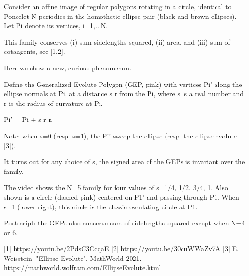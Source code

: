 Consider an affine image of regular polygons rotating in a circle, identical to Poncelet N-periodics in the homothetic ellipse pair (black and brown ellipses). Let Pi denote its vertices, i=1,...N.

This family conserves (i) sum sidelengths squared, (ii) area, and (iii) sum of cotangents, see [1,2].

Here we show a new, curious phenomenon.

Define the Generalized Evolute Polygon (GEP, pink) with vertices Pi' along the ellipse normals at Pi, at a distance s r from the Pi, where s is a real number and r is the radius of curvature at Pi. 

Pi' = Pi + s r n

Note: when s=0 (resp. s=1), the Pi' sweep the ellipse (resp. the ellipse evolute [3]).

It turns out for any choice of s, the signed area of the GEPs is invariant over the family.

The video shows the N=5 family for four values of s={1/4, 1/2, 3/4, 1}. Also shown is a circle (dashed pink) centered on P1' and passing through P1. When s=1 (lower right), this circle is the classic osculating circle at P1.

Postscript: the GEPs also conserve sum of sidelengths squared except when N=4 or 6.

[1] https://youtu.be/2PdsC3CcqaE
[2] https://youtu.be/30cuWWaZv7A
[3] E. Weisstein, "Ellipse Evolute", MathWorld 2021. https://mathworld.wolfram.com/EllipseEvolute.html